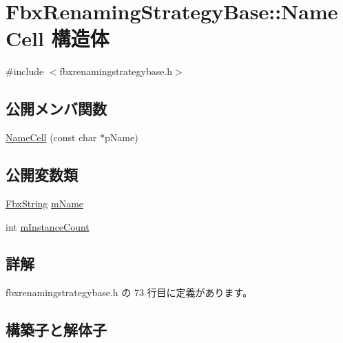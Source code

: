 \hypertarget{struct_fbx_renaming_strategy_base_1_1_name_cell}{}\section{Fbx\+Renaming\+Strategy\+Base\+:\+:Name\+Cell 構造体}
\label{struct_fbx_renaming_strategy_base_1_1_name_cell}


{\ttfamily \#include $<$fbxrenamingstrategybase.\+h$>$}

\subsection*{公開メンバ関数}
\begin{DoxyCompactItemize}
\item 
\hyperlink{struct_fbx_renaming_strategy_base_1_1_name_cell_a8f929f28be67eb8316d406207be8c869}{Name\+Cell} (const char $\ast$p\+Name)
\end{DoxyCompactItemize}
\subsection*{公開変数類}
\begin{DoxyCompactItemize}
\item 
\hyperlink{class_fbx_string}{Fbx\+String} \hyperlink{struct_fbx_renaming_strategy_base_1_1_name_cell_ac58a51c6b6e8b2bcd2f0fe2e34fdd83e}{m\+Name}
\item 
int \hyperlink{struct_fbx_renaming_strategy_base_1_1_name_cell_a5f9f539c454fbc1a08e90b59618016b7}{m\+Instance\+Count}
\end{DoxyCompactItemize}


\subsection{詳解}


 fbxrenamingstrategybase.\+h の 73 行目に定義があります。



\subsection{構築子と解体子}
\mbox{\label{struct_fbx_renaming_strategy_base_1_1_name_cell_a8f929f28be67eb8316d406207be8c869}} 

